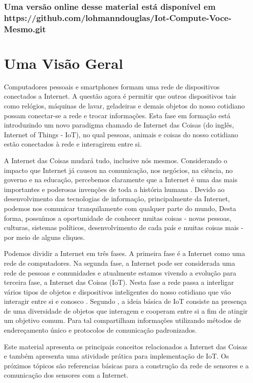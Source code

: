 \subsection*{\center \normalsize Uma versão online desse material está disponível em https://github.com/lohmanndouglas/Iot-Compute-Voce-Mesmo.git }


%

%
\tableofcontents
%
\mainmatter

\chapter{Uma Visão Geral}
Computadores pessoais e smartphones formam uma rede de dispositivos conectados a Internet. A questão agora é permitir  que outros dispositivos tais como relógios, máquinas de lavar, geladeiras e demais objetos do nosso cotidiano possam conectar-se a rede e trocar informações. Esta fase em formação está introduzindo um novo paradigma chamado de Internet das Coisas (do inglês, Internet of Things - IoT), no qual pessoas, animais e coisas do nosso cotidiano estão conectados à rede e interagirem entre si.


A Internet das Coisas mudará tudo, inclusive nós mesmos. Considerando o impacto que Internet já causou na comunicação, nos negócios, na ciência, no governo e na educação, percebemos claramente que a Internet é uma das mais importantes e poderosas invenções de toda a história humana \cite{daveevans2011}. Devido ao desenvolvimento das tecnologias de informação, principalmente da Internet, podemos nos comunicar tranquilamente com qualquer parte do mundo, Desta forma, possuímos a oportunidade de conhecer muitas coisas - novas pessoas, culturas, sistemas políticos, desenvolvimento de cada país e muitas coisas mais - por meio de alguns cliques. 


Podemos dividir a Internet em três fases. A primeira fase é a Internet como uma rede de computadores. Na segunda fase, a Internet pode ser considerada uma rede de pessoas e comunidades e atualmente estamos vivendo a evolução para terceira fase, a Internet das Coisas (IoT). Nesta fase a rede passa a interligar vários tipos de objetos e dispositivos inteligentes do nosso cotidiano que vão interagir entre si e conosco \cite{nicbr}.
Segundo \cite{atzori2010internet}, a ideia básica de IoT consiste na presença de uma diversidade de  objetos que interagem e cooperam entre si a fim de atingir um objetivo comum. Para tal compartilham informações utilizando métodos de endereçamento único e protocolos de comunicação padronizados. 

Este material apresenta os principais conceitos relacionados a Internet das Coisas e também apresenta uma atividade prática para implementação de IoT. Os próximos tópicos são referencias básicas para a construção da rede de sensores e a comunicação dos sensores com a Internet. 
